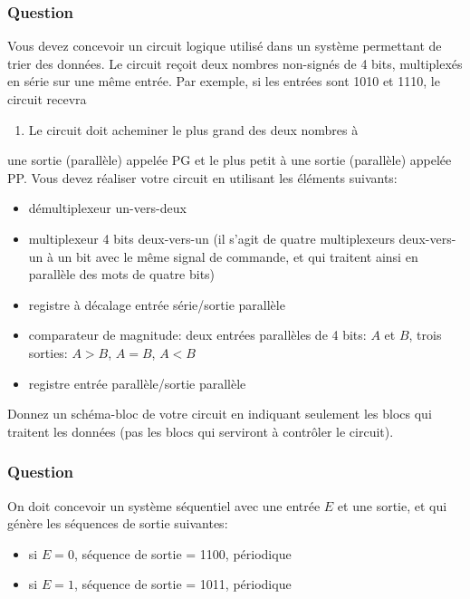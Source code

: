 \documentclass[11pt]{article}
\begin{document}
\subsubsection*{Question}
\label{sec:org6e279b3}
Vous devez concevoir un circuit logique utilisé dans un système
permettant de trier des données. Le circuit reçoit deux nombres
non-signés de 4 bits, multiplexés en série sur une même entrée. Par
exemple, si les entrées sont 1010 et 1110, le circuit recevra
\begin{enumerate}
\item Le circuit doit acheminer le plus grand des deux nombres à
\end{enumerate}
une sortie (parallèle) appelée PG et le plus petit à une sortie
(parallèle) appelée PP. Vous devez réaliser votre circuit en utilisant
les éléments suivants:

\begin{itemize}
\item démultiplexeur un-vers-deux

\item multiplexeur 4 bits deux-vers-un (il s'agit de quatre
multiplexeurs deux-vers-un à un bit avec le même signal de
commande, et qui traitent ainsi en parallèle des mots de quatre bits)

\item registre à décalage entrée série/sortie parallèle

\item comparateur de magnitude: deux entrées parallèles de 4 bits: \(A\) et
\(B\), trois sorties: \(A>B\), \(A=B\), \(A<B\)

\item registre entrée parallèle/sortie parallèle
\end{itemize}

Donnez un schéma-bloc de votre circuit en indiquant seulement les
blocs qui traitent les données (pas les blocs qui serviront à contrôler
le circuit).

\subsubsection*{Question}
\label{sec:org2e395ed}
On doit concevoir un système séquentiel avec une entrée \(E\) et une
sortie, et qui génère les séquences de sortie suivantes:

\begin{itemize}
\item si \(E=0\), séquence de sortie = 1100, périodique

\item si \(E=1\), séquence de sortie = 1011, périodique
\end{itemize}
\end{document}
